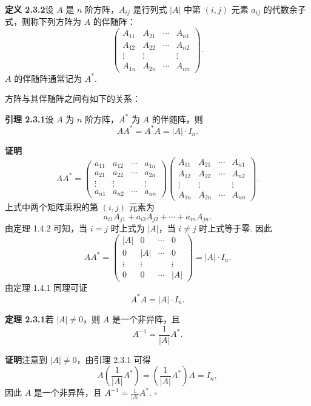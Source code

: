 \documentclass[UTF8,12pt,a4paper,fontset=fandol]{ctexart}
\begin{document}
\noindent\textbf{定义 2.3.2}\quad 设 $A$ 是 $n$ 阶方阵，$A_{ij}$ 是行列式 $|A|$ 中第 $(i,j)$ 元素 $a_{ij}$ 的代数余子式，则称下列方阵为 $A$ 的伴随阵：
\[
\left(\begin{array}{cccc}
A_{11} & A_{21} & \cdots & A_{n1}\\
A_{12} & A_{22} & \cdots & A_{n2}\\
\vdots & \vdots & & \vdots\\
A_{1n} & A_{2n} & \cdots & A_{nn}
\end{array}\right).
\]
$A$ 的伴随阵通常记为 $A^*$.

方阵与其伴随阵之间有如下的关系：

\noindent\textbf{引理 2.3.1}\quad 设 $A$ 为 $n$ 阶方阵，$A^*$ 为 $A$ 的伴随阵，则
\[
AA^*=A^*A=|A|\cdot I_n.
\]

\noindent\textbf{证明}\quad
\[
AA^*=
\left(\begin{array}{cccc}
a_{11} & a_{12} & \cdots & a_{1n}\\
a_{21} & a_{22} & \cdots & a_{2n}\\
\vdots & \vdots & & \vdots\\
a_{n1} & a_{n2} & \cdots & a_{nn}
\end{array}\right)
\left(\begin{array}{cccc}
A_{11} & A_{21} & \cdots & A_{n1}\\
A_{12} & A_{22} & \cdots & A_{n2}\\
\vdots & \vdots & & \vdots\\
A_{1n} & A_{2n} & \cdots & A_{nn}
\end{array}\right).
\]
上式中两个矩阵乘积的第 $(i,j)$ 元素为
\[
a_{i1}A_{j1}+a_{i2}A_{j2}+\cdots+a_{in}A_{jn}.
\]
由定理 1.4.2 可知，当 $i=j$ 时上式为 $|A|$，当 $i\ne j$ 时上式等于零. 因此
\[
AA^*=
\left(\begin{array}{cccc}
|A| & 0 & \cdots & 0\\
0 & |A| & \cdots & 0\\
\vdots & \vdots & & \vdots\\
0 & 0 & \cdots & |A|
\end{array}\right)
=|A|\cdot I_n.
\]
由定理 1.4.1 同理可证
\[
A^*A=|A|\cdot I_n.
\]

\noindent\textbf{定理 2.3.1}\quad 若 $|A|\ne 0$，则 $A$ 是一个非异阵，且
\[
A^{-1}=\frac{1}{|A|}A^*.
\]

\noindent\textbf{证明}\quad 注意到 $|A|\ne 0$，由引理 2.3.1 可得
\[
A\left(\frac{1}{|A|}A^*\right)=\left(\frac{1}{|A|}A^*\right)A=I_n,
\]
因此 $A$ 是一个非异阵，且 $A^{-1}=\frac{1}{|A|}A^*$. $\square$
\end{document}
